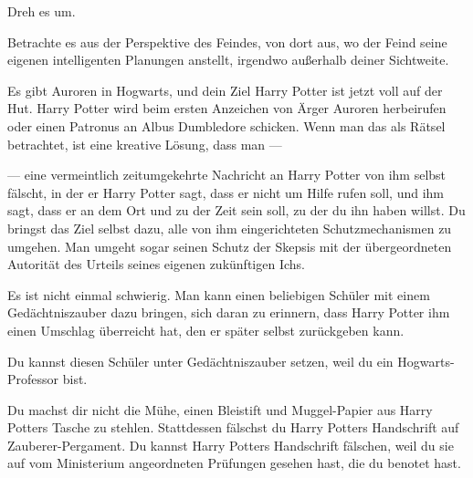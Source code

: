 Dreh es um.

Betrachte es aus der Perspektive des Feindes, von dort aus, wo der Feind seine eigenen intelligenten Planungen anstellt, irgendwo außerhalb deiner Sichtweite.

Es gibt Auroren in Hogwarts, und dein Ziel Harry Potter ist jetzt voll auf der Hut. Harry Potter wird beim ersten Anzeichen von Ärger Auroren herbeirufen oder einen Patronus an Albus Dumbledore schicken. Wenn man das als Rätsel betrachtet, ist eine kreative Lösung, dass man —

— eine vermeintlich zeitumgekehrte Nachricht an Harry Potter von ihm selbst fälscht, in der er Harry Potter sagt, dass er nicht um Hilfe rufen soll, und ihm sagt, dass er an dem Ort und zu der Zeit sein soll, zu der du ihn haben willst. Du bringst das Ziel selbst dazu, alle von ihm eingerichteten Schutzmechanismen zu umgehen. Man umgeht sogar seinen Schutz der Skepsis mit der übergeordneten Autorität des Urteils seines eigenen zukünftigen Ichs.

Es ist nicht einmal schwierig. Man kann einen beliebigen Schüler mit einem Gedächtniszauber dazu bringen, sich daran zu erinnern, dass Harry Potter ihm einen Umschlag überreicht hat, den er später selbst zurückgeben kann.

Du kannst diesen Schüler unter Gedächtniszauber setzen, weil du ein Hogwarts-Professor bist.

Du machst dir nicht die Mühe, einen Bleistift und Muggel-Papier aus Harry Potters Tasche zu stehlen. Stattdessen fälschst du Harry Potters Handschrift auf Zauberer-Pergament. Du kannst Harry Potters Handschrift fälschen, weil du sie auf vom Ministerium angeordneten Prüfungen gesehen hast, die du benotet hast.

